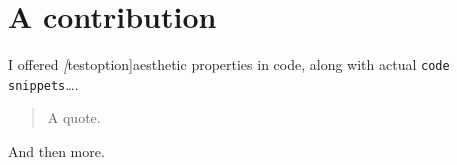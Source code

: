 

\section{A contribution}

I offered \emph[testoption]{aesthetic properties} in code, along with actual \lstinline{code snippets}\dots.

\begin{quote}
    A quote.
\end{quote}

And then more.

